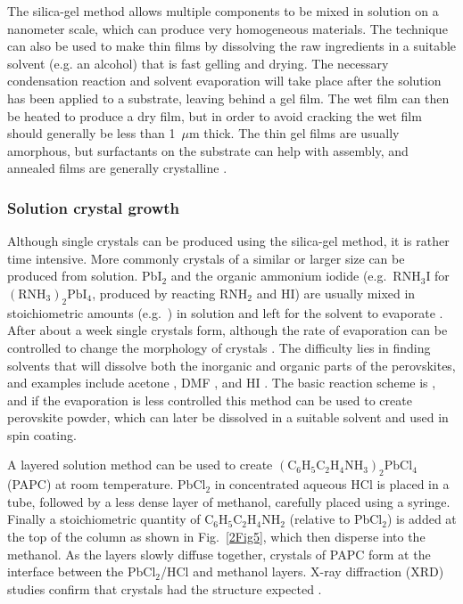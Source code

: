 The silica-gel method allows multiple components to be mixed in solution on a nanometer scale, which can produce very homogeneous materials. The technique can also be used to make thin films by dissolving the raw ingredients in a suitable solvent (e.g. an alcohol) that is fast gelling and drying. The necessary condensation reaction and solvent evaporation will take place after the solution has been applied to a substrate, leaving behind a gel film. The wet film can then be heated to produce a dry film, but in order to avoid cracking the wet film should generally be less than 1~$\mu$m thick. The thin gel films are usually amorphous, but surfactants on the substrate can help with assembly, and annealed films are generally crystalline \cite{Mitzi2001b}.

\subsubsection{Solution crystal growth}
\label{sec:solutiongrowth}
Although single crystals can be produced using the silica-gel method, it is rather time intensive. More commonly crystals of a similar or larger size can be produced from solution. Pb$\textrm{I}_2$ and the organic ammonium iodide (e.g.\ R$\textrm{NH}_3$I for $(\textrm{RNH}_3)_2\textrm{PbI}_4$, produced by reacting R$\textrm{NH}_2$ and HI) are usually mixed in stoichiometric amounts (e.g.\ \cite{Kitazawa1996, Tang2001}) in solution and left for the solvent to evaporate \cite{Ishihara1994}. After about a week single crystals form, although the rate of evaporation can be controlled to change the morphology of crystals \cite{Cheng2010}. The difficulty lies in finding solvents that will dissolve both the inorganic and organic parts of the perovskites, and examples include acetone \cite{Hong1992}, DMF \cite{Kitazawa1996}, and HI \cite{Barman2003}. The basic reaction scheme is , and if the evaporation is less controlled this method can be used to create perovskite powder, which can later be dissolved in a suitable solvent and used in spin coating.

A layered solution method can be used to create $(\textrm{C}_6\textrm{H}_5\textrm{C}_2\textrm{H}_4\textrm{NH}_3)_2\textrm{PbCl}_4$ (PAPC) at room temperature. Pb$\textrm{Cl}_2$ in concentrated aqueous HCl is placed in a tube, followed by a less dense layer of methanol, carefully placed using a syringe. Finally a stoichiometric quantity of $\textrm{C}_6\textrm{H}_5\textrm{C}_2\textrm{H}_4\textrm{NH}_2$ (relative to Pb$\textrm{Cl}_2$) is added at the top of the column as shown in Fig.\ \ref{2Fig5}, which then disperse into the methanol. As the layers slowly diffuse together, crystals of PAPC form at the interface between the Pb$\textrm{Cl}_2$/HCl and methanol layers. X-ray diffraction (XRD) studies confirm that crystals had the structure expected \cite{Mitzi1999b}.

